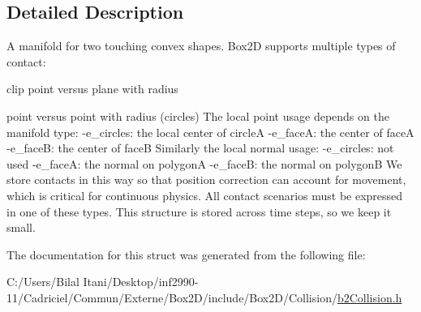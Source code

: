 \subsection{Detailed Description}
A manifold for two touching convex shapes. Box2D supports multiple types of contact\+:
\begin{DoxyItemize}
\item clip point versus plane with radius
\item point versus point with radius (circles) The local point usage depends on the manifold type\+: -\/e\+\_\+circles\+: the local center of circleA -\/e\+\_\+faceA\+: the center of faceA -\/e\+\_\+faceB\+: the center of faceB Similarly the local normal usage\+: -\/e\+\_\+circles\+: not used -\/e\+\_\+faceA\+: the normal on polygonA -\/e\+\_\+faceB\+: the normal on polygonB We store contacts in this way so that position correction can account for movement, which is critical for continuous physics. All contact scenarios must be expressed in one of these types. This structure is stored across time steps, so we keep it small. 
\end{DoxyItemize}

The documentation for this struct was generated from the following file\+:\begin{DoxyCompactItemize}
\item 
C\+:/\+Users/\+Bilal Itani/\+Desktop/inf2990-\/11/\+Cadriciel/\+Commun/\+Externe/\+Box2\+D/include/\+Box2\+D/\+Collision/\hyperlink{b2_collision_8h}{b2\+Collision.\+h}\end{DoxyCompactItemize}
